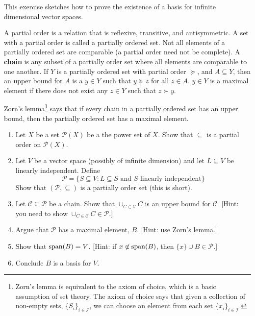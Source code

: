 \begin{exercise}\label{ex:basis}
  This exercise sketches how to prove the existence of a basis for
  infinite dimensional vector spaces.
  
  A partial order is a relation that is reflexive, transitive, and
  antisymmetric. A set with a partial order is called a partially
  ordered set. Not all elements of a partially ordered set are
  comparable (a partial order need not be complete). A \textbf{chain}
  is any subset of a partially order set where all elements are
  comparable to one another. If $Y$ is a partially ordered set with
  partial order $\succeq$, and $A \subseteq Y$, then an upper bound
  for $A$ is a $y \in Y$ such that $y \succeq z$ for all $z \in A$.
  $y \in Y$ is a maximal element if there does not exist any $z \in Y$
  such that $z \succ y$.
  
  Zorn's lemma\footnote{Zorn's lemma is equivalent to the axiom of
    choice, which is a basic assumption of set theory. The axiom of
    choice says that given a collection of non-empty sets,
    $\{S_i\}_{i \in \mathcal{I}}$, we can choose an element from each
    set $\{x_i\}_{i \in \mathcal{I}}$.} says that if every chain in a
  partially ordered set has an upper bound, then the partially ordered
  set has a maximal element.
  \begin{enumerate}
  \item Let $X$ be a set $\mathcal{P}(X)$ be a the power set of
    $X$. Show that $\subseteq$ is a partial order on $\mathcal{P}(X)$.
  \item Let $V$ be a vector space (possibly of infinite dimension) and
    let $L \subseteq V$ be linearly independent. Define 
    \[ \mathcal{P} = \{S \subseteq V: L \subseteq S \text{ and } S
    \text{ linearly independent}\} \]
    Show that $(\mathcal{P},\subseteq)$ is a partially order set (this is
    short).
  \item Let $\mathcal{C} \subseteq \mathcal{P}$ be a chain. Show that
    $\cup_{C \in \mathcal{C}} C$ is an upper bound for
    $\mathcal{C}$. [Hint: you need to show $\cup_{C \in \mathcal{C}} C
    \in \mathcal{P}$.]
  \item Argue that $\mathcal{P}$ has a maximal element, $B$. [Hint:
    use Zorn's lemma.]
  \item Show that $\mathrm{span}(B) = V$. [Hint: if $x \not\in \mathrm{span}(B)$, then
    $\{x\} \cup B \in \mathcal{P}$.]
  \item Conclude $B$ is a basis for $V$.
  \end{enumerate}
\end{exercise}
